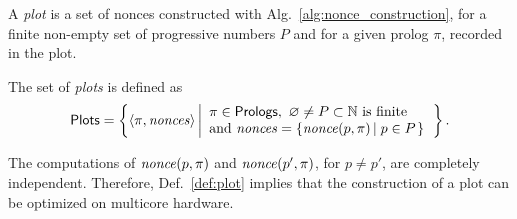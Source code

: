 %
%
%
A \emph{plot} is a set of nonces constructed with Alg.~\ref{alg:nonce_construction},
for a finite non-empty set of progressive numbers $P$ and
for a given prolog $\pi$, recorded in the plot.
%
\begin{definition}[Plot]\label{def:plot}
  The set of \emph{plots} is defined as
  \[
  {\mathsf{Plots}}=\left\{\left<\pi,{\mathit{nonces}}\right>\left|\begin{array}{l}
  \pi\in{\mathsf{Prologs}},\ \varnothing\not=P\subset\mathbb{N}\text{ is finite}\\
  \text{and }{\mathit{nonces}}=\left\{{\mathit{nonce}}(p,\pi)\left|\;p\in P\right.\right\}
  \end{array}\right.\right\}.
  \]
\end{definition}
%
The computations of ${\mathit{nonce}}(p,\pi)$ and ${\mathit{nonce}}(p',\pi)$, for $p\not=p'$,
are completely independent. Therefore, Def.~\ref{def:plot}
implies that the construction of a plot can be optimized on
multicore hardware.
